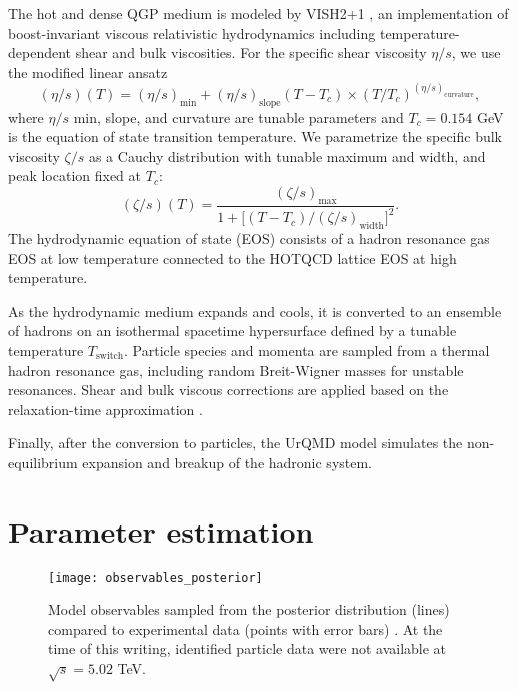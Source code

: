 \documentclass[3p,times,procedia,sort&compress]{elsarticle}
\begin{document}
The hot and dense QGP medium is modeled by VISH2+1 \cite{Shen:2014vra, Bernhard:2016tnd}, an implementation of boost-invariant viscous relativistic hydrodynamics including temperature-dependent shear and bulk viscosities.
For the specific shear viscosity $\eta/s$, we use the modified linear ansatz
\begin{equation}
  (\eta/s)(T) = (\eta/s)_\text{min} + (\eta/s)_\text{slope}(T - T_c) \times (T/T_c)^{(\eta/s)_\text{curvature}},
  \label{eq:shear}
\end{equation}
where $\eta/s$ min, slope, and curvature are tunable parameters and $T_c = 0.154$ GeV is the equation of state transition temperature.
We parametrize the specific bulk viscosity $\zeta/s$ as a Cauchy distribution with tunable maximum and width, and peak location fixed at $T_c$:
\begin{equation}
  (\zeta/s)(T) = \frac{(\zeta/s)_\text{max}}{1 + \bigl[ (T - T_c)/(\zeta/s)_\text{width} \bigr]^2}.
  \label{eq:bulk}
\end{equation}
The hydrodynamic equation of state (EOS) consists of a hadron resonance gas EOS at low temperature connected to the HOTQCD lattice EOS \cite{Bazavov:2014pvz} at high temperature.

As the hydrodynamic medium expands and cools, it is converted to an ensemble of hadrons on an isothermal spacetime hypersurface defined by a tunable temperature $T_\text{switch}$.
Particle species and momenta are sampled from a thermal hadron resonance gas, including random Breit-Wigner masses for unstable resonances.
Shear and bulk viscous corrections are applied based on the relaxation-time approximation \cite{Pratt:2010jt, Dusling:2011fd}.

Finally, after the conversion to particles, the UrQMD model simulates the non-equilibrium expansion and breakup of the hadronic system.


\section{Parameter estimation}

\begin{figure}[t]
  \centering
  \texttt{[image: observables\_posterior]}
  \caption{
    Model observables sampled from the posterior distribution (lines) compared to experimental data (points with error bars) \cite{Aamodt:2010cz, Abelev:2013vea, Adam:2015ptt, Adam:2016izf}.
    At the time of this writing, identified particle data were not available at $\sqrt s = 5.02$ TeV.
  }
  \label{fig:observables_posterior}
\end{figure}
\end{document}
